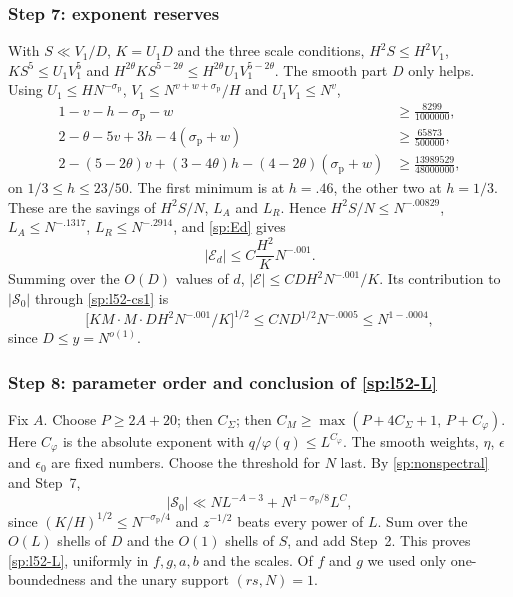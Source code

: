 \subsubsection*{Step 7: exponent reserves}
With $S\ll V_1/D$, $K=U_1D$ and the three scale conditions,
$H^2S\le H^2V_1$, $KS^5\le U_1V_1^5$ and
$H^{2\theta}KS^{5-2\theta}\le H^{2\theta}U_1V_1^{5-2\theta}$. The smooth part
$D$ only helps. Using $U_1\le HN^{-\sigma_{\mathrm p}}$,
$V_1\le N^{v+w+\sigma_{\mathrm p}}/H$ and $U_1V_1\le N^v$,
\begin{equation}\label{sp:reserves}
\begin{aligned}
 1-v-h-\sigma_{\mathrm p}-w&\ge\tfrac{8299}{1000000},\\
 2-\theta-5v+3h-4(\sigma_{\mathrm p}+w)&\ge\tfrac{65873}{500000},\\
 2-(5-2\theta)v+(3-4\theta)h-(4-2\theta)(\sigma_{\mathrm p}+w)&\ge\tfrac{13989529}{48000000},
\end{aligned}
\end{equation}
on $1/3\le h\le23/50$. The first minimum is at $h=.46$, the other two at
$h=1/3$. These are the savings of $H^2S/N$, $L_A$ and $L_R$. Hence
$H^2S/N\le N^{-.00829}$, $L_A\le N^{-.1317}$, $L_R\le N^{-.2914}$, and
\eqref{sp:Ed} gives
\begin{equation}\label{sp:Ed-final}
 |\mathcal E_d|\le C\frac{H^2}KN^{-.001}.
\end{equation}
Summing over the $O(D)$ values of $d$, $|\mathcal E|\le CDH^2N^{-.001}/K$.
Its contribution to $|\mathcal S_0|$ through \eqref{sp:l52-cs1} is
\[
 \bigl[KM\cdot M\cdot DH^2N^{-.001}/K\bigr]^{1/2}\le CND^{1/2}N^{-.0005}\le N^{1-.0004},
\]
since $D\le y=N^{o(1)}$.

\subsubsection*{Step 8: parameter order and conclusion of \eqref{sp:l52-L}}
Fix $A$. Choose $P\ge2A+20$; then $C_\Sigma$; then $C_M\ge\max(P+4C_\Sigma+1,\,P+C_\varphi)$. Here $C_\varphi$ is the absolute exponent with $q/\varphi(q)\le L^{C_\varphi}$. The smooth
weights, $\eta$, $\epsilon$ and $\epsilon_0$ are fixed numbers. Choose the
threshold for $N$ last. By \eqref{sp:nonspectral} and Step~7,
\[
 |\mathcal S_0|\ll NL^{-A-3}+N^{1-\sigma_{\mathrm p}/8}L^{C},
\]
since $(K/H)^{1/2}\le N^{-\sigma_{\mathrm p}/4}$ and $z^{-1/2}$ beats every
power of $L$. Sum over the $O(L)$ shells of $D$ and the $O(1)$ shells of
$S$, and add Step~2. This proves \eqref{sp:l52-L}, uniformly in $f,g,a,b$ and
the scales. Of $f$ and $g$ we used only one-boundedness and the
unary support $(rs,N)=1$.

